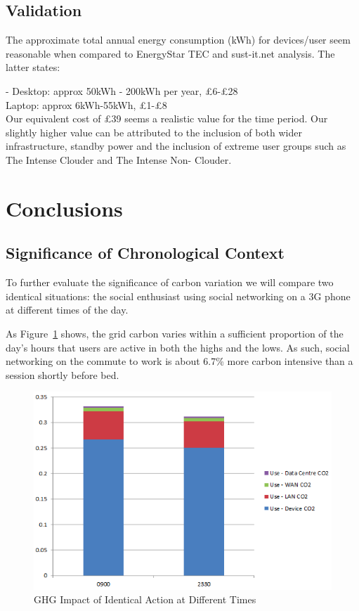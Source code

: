 \documentclass[conference]{IEEEtran}
\begin{document}
\subsection{Validation}

The approximate total annual energy consumption (kWh) for devices/user
seem reasonable when compared to EnergyStar TEC and sust-it.net
analysis. The latter states:

- Desktop: approx 50kWh - 200kWh per year, \pounds 6-\pounds 28\\
Laptop: approx 6kWh-55kWh, \pounds 1-\pounds 8\\

Our equivalent cost of \pounds 39 seems a realistic value for the time
period.  Our slightly higher value can be attributed to the inclusion
of both wider infrastructure, standby power and the inclusion of
extreme user groups such as The Intense Clouder and The Intense Non-
Clouder.


\section{Conclusions}

\subsection{Significance of Chronological Context}

To further evaluate the significance of carbon variation we will
compare two identical situations: the social enthusiast using social
networking on a 3G phone at different times of the day.

As Figure~\ref{fig:ghgimpact_times} shows, the grid carbon varies
within a sufficient proportion of the day’s hours that users are
active in both the highs and the lows. As such, social networking on
the commute to work is about 6.7\% more carbon intensive than a
session shortly before bed.

\begin{figure}[!ht]
\centering
\includegraphics[width=\columnwidth]{images/ghgimpact_times.png}
\caption{GHG Impact of Identical Action at Different Times}
\label{fig:ghgimpact_times} 
\end{figure}
\end{document}
